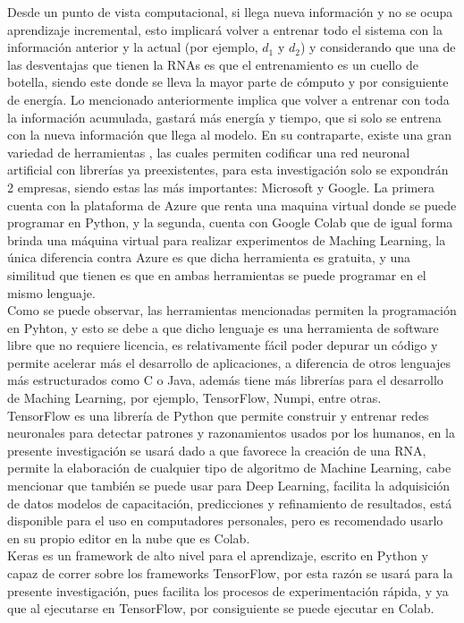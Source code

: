     Desde un punto de vista computacional, si llega nueva información y no se ocupa aprendizaje 
    incremental, esto implicar\'a volver a entrenar todo el sistema con la información anterior y 
    la actual (por ejemplo, $d_{1}$ y $d_{2}$) y considerando que una de las desventajas que tienen la 
    RNAs es que el entrenamiento es un cuello de botella, siendo este donde se lleva la mayor 
    parte de cómputo y por consiguiente de energía. Lo mencionado anteriormente implica que volver a entrenar con toda 
    la información acumulada, gastará más energía y tiempo, que si solo se entrena con la nueva 
    información que llega al modelo. En su contraparte,  existe una gran variedad de herramientas ,
    las cuales permiten codificar una red neuronal artificial con librerías ya preexistentes, para esta investigación solo se 
    expondrán 2 empresas, siendo estas las más importantes: Microsoft y Google. 
    La primera cuenta con la plataforma de Azure que renta una maquina virtual donde se puede 
    programar en Python, y la segunda, cuenta con Google Colab que de igual forma brinda 
    una m\'aquina virtual para realizar experimentos de Maching Learning, la \'unica diferencia 
    contra Azure es que dicha herramienta es gratuita, y una similitud que tienen es que en ambas herramientas
    se puede programar en el mismo lenguaje.\\

    Como se puede observar, las herramientas mencionadas permiten la programación en Pyhton, y esto se debe a que 
    dicho lenguaje es una herramienta de software libre que no requiere licencia, es relativamente 
    fácil poder depurar un código y permite acelerar más el desarrollo de aplicaciones,  a diferencia 
    de otros lenguajes más estructurados como C o Java, adem\'as tiene m\'as librerías para el 
    desarrollo de Maching Learning, por ejemplo, TensorFlow, Numpi, entre otras. \\

    TensorFlow es una librería de Python que permite construir y entrenar redes neuronales para 
    detectar patrones y razonamientos usados por los humanos, en la presente investigaci\'on se 
    usar\'a dado a que favorece la creaci\'on de una RNA, permite la elaboraci\'on de cualquier 
    tipo de algoritmo de Machine Learning, cabe mencionar que también se puede usar para Deep Learning, 
    facilita la adquisici\'on de datos modelos de capacitaci\'on, predicciones y refinamiento de 
    resultados, est\'a disponible para el uso en computadores personales, pero es recomendado 
    usarlo en su propio editor en la nube que es Colab.\\
    
    Keras es un framework de alto nivel para 
    el aprendizaje, escrito en Python y capaz de correr sobre los frameworks TensorFlow, por esta razón se usar\'a para la presente investigación, pues facilita los procesos de experimentación rápida, y ya que al ejecutarse en TensorFlow, por consiguiente se puede ejecutar en Colab.